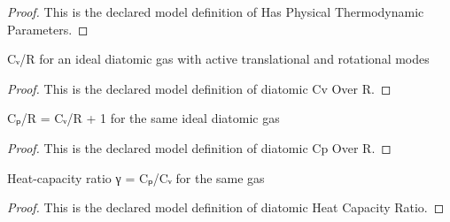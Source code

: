 \begin{proof}
  This is the declared model definition of Has Physical Thermodynamic Parameters.
\end{proof}
\begin{definition}
  \label{def:physics:phyx-mini-0429:phyxminiproblems-problemphyxmini0429-diatomiccvoverr}
  Cᵥ/R for an ideal diatomic gas with active translational and rotational modes
\end{definition}
\begin{proof}
  This is the declared model definition of diatomic Cv Over R.
\end{proof}
\begin{definition}
  \label{def:physics:phyx-mini-0429:phyxminiproblems-problemphyxmini0429-diatomiccpoverr}
  Cₚ/R = Cᵥ/R + 1 for the same ideal diatomic gas
\end{definition}
\begin{proof}
  This is the declared model definition of diatomic Cp Over R.
\end{proof}
\begin{definition}
  \label{def:physics:phyx-mini-0429:phyxminiproblems-problemphyxmini0429-diatomicheatcapacityratio}
  Heat-capacity ratio γ = Cₚ/Cᵥ for the same gas
\end{definition}
\begin{proof}
  This is the declared model definition of diatomic Heat Capacity Ratio.
\end{proof}
